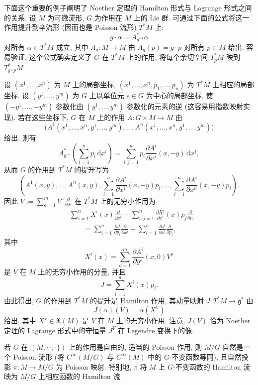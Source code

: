 \begin{RiemannExample}\label{ex:momentum-map-for-cotangent-lift}
下面这个重要的例子阐明了 Noether 定理的 Hamilton 形式与 Lagrange 形式之间的关系. 设 $M$ 为可微流形, $G$ 为作用在 $M$ 上的 Lie 群. 可通过下面的公式将这一作用提升到辛流形 (因而也是 Poisson 流形) $T^*M$ 上:
\[
  g\cdot\alpha=A_{g^{-1}}^*\alpha
\]
对所有 $\alpha\in T^*M$ 成立, 其中 $A_g:M\to M$ 由 $A_g(p)=g\cdot p$ 对所有 $p\in M$ 给出. 容易验证, 这个公式确实定义了 $G$ 在 $T^*M$ 上的作用, 将每个余切空间 $T_p^*M$ 映到 $T_{g\cdot p}^*M$.

设 $(x^1,\ldots,x^n)$ 为 $M$ 上的局部坐标, $(x^1,\ldots,x^n,p_1,\ldots,p_n)$ 为 $T^*M$ 上相应的局部坐标. 设 $(y^1,\ldots,y^m)$ 为 $G$ 上以单位元 $e\in G$ 为中心的局部坐标, 使 $(-y^1,\ldots,-y^m)$ 参数化由 $(y^1,\ldots,y^m)$ 参数化的元素的逆 (这容易用指数映射实现). 若在这些坐标下, $G$ 在 $M$ 上的作用 $A:G\times M\to M$ 由
\[
  \bigl(A^1(x^1,\ldots,x^n,y^1,\ldots,y^m),\ldots,
        A^n(x^1,\ldots,x^n,y^1,\ldots,y^m)\bigr)
\]
给出, 则有
\[
  A_{g^{-1}}^*\left(\sum_{i=1}^n p_i\,\mathrm{d}x^i\right)
  =\sum_{i,j=1}^n p_i\frac{\partial A^i}{\partial x^j}(x,-y)\,\mathrm{d}x^j,
\]
从而 $G$ 的作用到 $T^*M$ 的提升写为
\[
  \left(A^1(x,y),\ldots,A^n(x,y),
  \sum_{i=1}^n\frac{\partial A^i}{\partial x^1}(x,-y)p_i,\ldots,
  \sum_{i=1}^n\frac{\partial A^i}{\partial x^n}(x,-y)p_i\right).
\]
因此 $V:=\sum_{a=1}^m V^a\frac{\partial}{\partial y^a}$ 在 $T^*M$ 上的无穷小作用为
\begin{align*}
  &\sum_{i=1}^n X^i(x)\frac{\partial}{\partial x^i}
    -\sum_{i,j=1}^n\frac{\partial X^j}{\partial x^i}(x)p_j\frac{\partial}{\partial p_i}\\
  &\qquad=\sum_{i=1}^n\frac{\partial J}{\partial p_i}\frac{\partial}{\partial x^i}
    -\sum_{i=1}^n\frac{\partial J}{\partial x^i}\frac{\partial}{\partial p_i},
\end{align*}
其中
\[
  X^i(x)=\sum_{a=1}^m\frac{\partial A^i}{\partial y^a}(x,0)V^a
\]
是 $V$ 在 $M$ 上的无穷小作用的分量, 并且
\[
  J=\sum_{i=1}^n X^i(x)p_i.
\]
由此得出, $G$ 的作用到 $T^*M$ 的提升是 Hamilton 作用, 其动量映射 $J:T^*M\to\mathfrak{g}^*$ 由
\[
  J(\alpha)(V)=\alpha(X^V)
\]
给出, 其中 $X^V\in\mathfrak{X}(M)$ 是 $V$ 在 $M$ 上的无穷小作用. 注意, $J(V)$ 恰为 Noether 定理的 Lagrange 形式中的守恒量 $J^V$ 在 Legendre 变换下的像.
\end{RiemannExample}

\begin{RiemannTheorem}[Poisson 约化]\label{thm:poisson-reduction}
若 $G$ 在 $(M,\{\cdot,\cdot\})$ 上的作用是自由的, 适当的 Poisson 作用, 则 $M/G$ 自然是一个 Poisson 流形 (将 $C^\infty(M/G)$ 与 $C^\infty(M)$ 中的 $G$-不变函数等同), 且自然投影 $\pi:M\to M/G$ 为 Poisson 映射. 特别地, $\pi$ 将 $M$ 上 $G$-不变函数的 Hamilton 流映为 $M/G$ 上相应函数的 Hamilton 流.
\end{RiemannTheorem}

